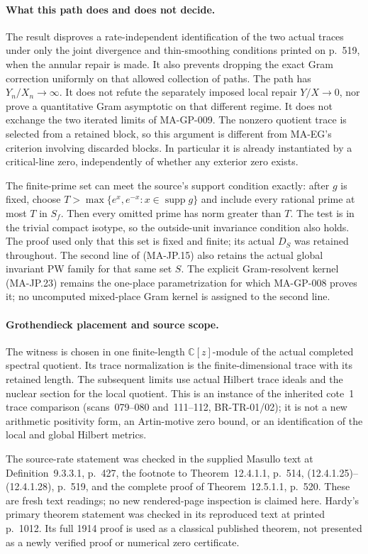 \paragraph{What this path does and does not decide.}
The result disproves a rate-independent identification
of the two actual traces under only the joint
divergence and thin-smoothing conditions printed on
p.~519, when the annular repair is made.
It also prevents dropping the exact Gram correction
uniformly on that allowed collection of paths.
The path has $Y_n/X_n\to\infty$.
It does not refute the separately imposed local
repair $Y/X\to0$, nor prove a quantitative Gram
asymptotic on that different regime.
It does not exchange the two iterated limits of
MA-GP-009.
The nonzero quotient trace is selected from a
retained block, so this argument is different
from MA-EG's criterion involving discarded blocks.
In particular it is already instantiated by a
critical-line zero, independently of whether any
exterior zero exists.

The finite-prime set can meet the source's support
condition exactly: after $g$ is fixed, choose
$T>\max\{e^x,e^{-x}:x\in\operatorname{supp}g\}$ and
include every rational prime at most $T$ in $S_f$.
Then every omitted prime has norm greater than $T$.
The test is in the trivial compact isotype, so the
outside-unit invariance condition also holds.
The proof used only that this set is fixed and
finite; its actual $D_S$ was retained throughout.
The second line of (MA-JP.15) also retains the
actual global invariant PW family for that same
set $S$.  The explicit Gram-resolvent kernel
(MA-JP.23) remains the one-place parametrization
for which MA-GP-008 proves it; no uncomputed
mixed-place Gram kernel is assigned to the
second line.

\paragraph{Grothendieck placement and source scope.}
The witness is chosen in one finite-length
$\mathbb C[z]$-module of the actual completed
spectral quotient.  Its trace normalization is
the finite-dimensional trace with its retained
length.  The subsequent limits use actual
Hilbert trace ideals and the nuclear section
for the local quotient.  This is an instance of
the inherited cote~1 trace comparison
(scans~079--080 and~111--112, BR-TR-01/02);
it is not a new arithmetic positivity form,
an Artin-motive zero bound, or an identification
of the local and global Hilbert metrics.

The source-rate statement was checked in the
supplied Masullo text at Definition~9.3.3.1,
p.~427, the footnote to Theorem~12.4.1.1,
p.~514, (12.4.1.25)--(12.4.1.28), p.~519,
and the complete proof of Theorem~12.5.1.1,
p.~520.  These are fresh text readings;
no new rendered-page inspection is claimed here.
Hardy's primary theorem statement was checked
in its reproduced text at printed p.~1012.
Its full 1914 proof is used as a classical
published theorem, not presented as a newly
verified proof or numerical zero certificate.

